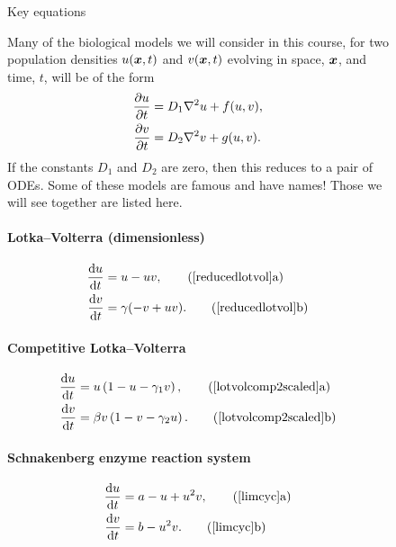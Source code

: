 \documentclass[main.tex]{subfiles}
\begin{document}
\begin{figure}
\begin{center} 
\textsf{\Large Key equations}
\end{center}
\vspace{0.3cm}
Many of the biological models we will consider in this course, for two population densities $u(\v{x},t)$ and $v(\v{x},t)$ evolving in space, $\v{x}$, and time, $t$, will be of the form
\begin{align*}
	\pd{u}{t} &= D_1 \Lap u + f(u,v),\\
	\pd{v}{t} &= D_2 \Lap v + g(u,v).
\end{align*}
If the constants $D_1$ and $D_2$ are zero, then this reduces to a pair of ODEs. Some of these models are famous and have names! Those we will see together are listed here.

\paragraph{Lotka--Volterra (dimensionless)}
\begin{subequations}
\begin{align}
\fd{u}{t} &= u - uv, \tag{\ref*{reducedlotvol}a}\\
\fd{v}{t} &= \gamma(-v +uv).\tag{\ref*{reducedlotvol}b}
\end{align}
\end{subequations}

\paragraph{Competitive Lotka--Volterra}
\begin{subequations}
\begin{align}
\fd{u}{t} &= u\left(1-u - \gamma_1 v\right), 
\tag{\ref*{lotvolcomp2scaled}a} \\
\fd{v}{t} &= \beta v \left(1-v - \gamma_2 u\right).
\tag{\ref*{lotvolcomp2scaled}b}
\end{align}
\end{subequations}

\paragraph{Schnakenberg enzyme reaction system}
\begin{subequations}
\begin{align}
\fd{u}{t} &= a - u +u^2v, \tag{\ref*{limcyc}a}\\
\fd{v}{t} &= b - u^2v.\tag{\ref*{limcyc}b}
\end{align}
\end{subequations}


\end{figure}
\end{document}
